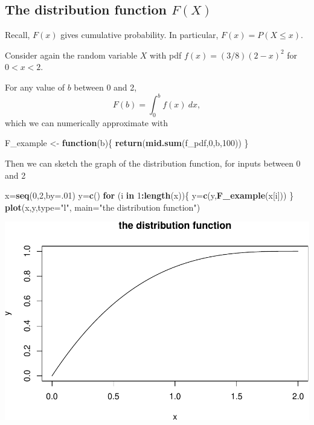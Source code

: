 \documentclass[
]{book}
\newenvironment{Shaded}{\begin{snugshade}}{\end{snugshade}}
\newcommand{\AttributeTok}[1]{\textcolor[rgb]{0.13,0.29,0.53}{#1}}
\newcommand{\ControlFlowTok}[1]{\textcolor[rgb]{0.13,0.29,0.53}{\textbf{#1}}}
\newcommand{\DecValTok}[1]{\textcolor[rgb]{0.00,0.00,0.81}{#1}}
\newcommand{\FunctionTok}[1]{\textcolor[rgb]{0.13,0.29,0.53}{\textbf{#1}}}
\newcommand{\NormalTok}[1]{#1}
\newcommand{\OtherTok}[1]{\textcolor[rgb]{0.56,0.35,0.01}{#1}}
\newcommand{\SpecialCharTok}[1]{\textcolor[rgb]{0.81,0.36,0.00}{\textbf{#1}}}
\newcommand{\StringTok}[1]{\textcolor[rgb]{0.31,0.60,0.02}{#1}}
\theoremstyle{definition}
\theoremstyle{definition}
\theoremstyle{definition}
\theoremstyle{definition}
\theoremstyle{remark}
\begin{document}
\subsection{\texorpdfstring{The distribution function \(F(X)\)}{The distribution function F(X)}}\label{the-distribution-function-fx}

Recall, \(F(x)\) gives cumulative probability. In particular, \(F(x) = P(X \leq x)\).

Consider again the random variable \(X\) with pdf \(f(x) = (3/8)(2-x)^2\) for \(0 < x < 2\).

For any value of \(b\) between 0 and 2, \[F(b) = \int_0^b f(x)~dx,\]
which we can numerically approximate with

\begin{Shaded}
\begin{Highlighting}[]
\NormalTok{F\_example }\OtherTok{\textless{}{-}} \ControlFlowTok{function}\NormalTok{(b)\{}
  \FunctionTok{return}\NormalTok{(}\FunctionTok{mid.sum}\NormalTok{(f\_pdf,}\DecValTok{0}\NormalTok{,b,}\DecValTok{100}\NormalTok{))}
\NormalTok{\}}
\end{Highlighting}
\end{Shaded}

Then we can sketch the graph of the distribution function, for inputs between 0 and 2

\begin{Shaded}
\begin{Highlighting}[]
\NormalTok{x}\OtherTok{=}\FunctionTok{seq}\NormalTok{(}\DecValTok{0}\NormalTok{,}\DecValTok{2}\NormalTok{,}\AttributeTok{by=}\NormalTok{.}\DecValTok{01}\NormalTok{)}
\NormalTok{y}\OtherTok{=}\FunctionTok{c}\NormalTok{()}
\ControlFlowTok{for}\NormalTok{ (i }\ControlFlowTok{in} \DecValTok{1}\SpecialCharTok{:}\FunctionTok{length}\NormalTok{(x))\{}
\NormalTok{  y}\OtherTok{=}\FunctionTok{c}\NormalTok{(y,}\FunctionTok{F\_example}\NormalTok{(x[i]))}
\NormalTok{\}}
\FunctionTok{plot}\NormalTok{(x,y,}\AttributeTok{type=}\StringTok{"l"}\NormalTok{,}
     \AttributeTok{main=}\StringTok{"the distribution function"}\NormalTok{)}
\end{Highlighting}
\end{Shaded}

\includegraphics{math340-notes_files/figure-latex/plot distn fcn-1.pdf}
\end{document}
